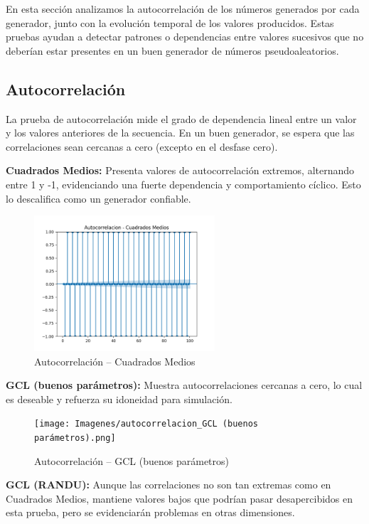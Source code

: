\documentclass{article}
\begin{document}
En esta sección analizamos la autocorrelación de los números generados por cada generador, junto con la evolución temporal de los valores producidos. Estas pruebas ayudan a detectar patrones o dependencias entre valores sucesivos que no deberían estar presentes en un buen generador de números pseudoaleatorios.

\subsection{Autocorrelación}

La prueba de autocorrelación mide el grado de dependencia lineal entre un valor y los valores anteriores de la secuencia. En un buen generador, se espera que las correlaciones sean cercanas a cero (excepto en el desfase cero).

\textbf{Cuadrados Medios:} Presenta valores de autocorrelación extremos, alternando entre 1 y -1, evidenciando una fuerte dependencia y comportamiento cíclico. Esto lo descalifica como un generador confiable.

\begin{figure}[H]
\centering
\includegraphics[width=0.6\textwidth]{Imagenes/autocorrelacion_Cuadrados Medios.png}
\caption{Autocorrelación – Cuadrados Medios}
\end{figure}

\textbf{GCL (buenos parámetros):} Muestra autocorrelaciones cercanas a cero, lo cual es deseable y refuerza su idoneidad para simulación.

\begin{figure}[H]
\centering
\texttt{[image: Imagenes/autocorrelacion\_GCL (buenos parámetros).png]}
\caption{Autocorrelación – GCL (buenos parámetros)}
\end{figure}

\textbf{GCL (RANDU):} Aunque las correlaciones no son tan extremas como en Cuadrados Medios, mantiene valores bajos que podrían pasar desapercibidos en esta prueba, pero se evidenciarán problemas en otras dimensiones.
\end{document}
